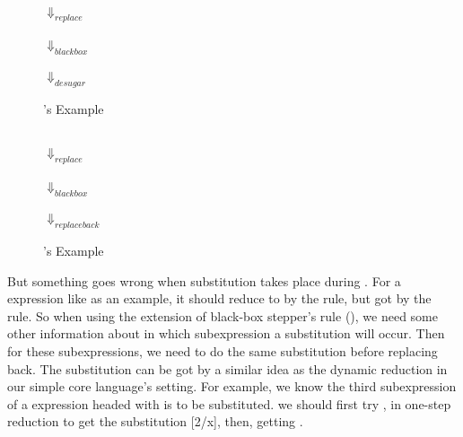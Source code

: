 \begin{center}
\begin{figure}[thb]
\centering
{}\\ $\Downarrow_{replace}$\\ \\ $\Downarrow_{blackbox}$\\ \\ $\Downarrow_{desugar}$\\ 
\caption{'s Example}
\label{fig:e1}
\end{figure}

\begin{figure}[thb]
\centering
{}\\ $\Downarrow_{replace}$ \\\\ $\Downarrow_{blackbox}$\\  \\ $\Downarrow_{replaceback}$\\ 
\caption{'s Example}
\label{fig:e2}
\end{figure}
\end{center}
But something goes wrong when substitution takes place during . For a expression like  as an example, it should reduce to  by the  rule, but got  by the  rule. So when using the extension of black-box stepper's rule (), we need some other information about in which subexpression a substitution will occur. Then for these subexpressions, we need to do the same substitution before replacing back. The substitution can be got by a similar idea as the dynamic reduction in our simple core language's setting. For example, we know the third subexpression of a expression headed with  is to be substituted. we should first try ,  in one-step reduction to get the substitution [2/x], then, getting . 

